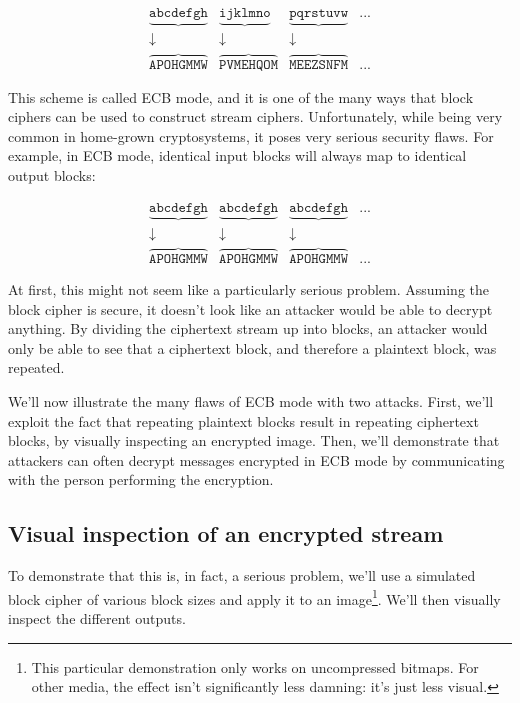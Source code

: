 \documentclass[11pt,ebook,table,dvipsnames]{memoir}
\begin{document}
\begin{equation}
\begin{matrix}
\underbrace{\mathtt{abcdefgh}} & \underbrace{\mathtt{ijklmno}} & \underbrace{\mathtt{pqrstuvw}} & ...\\
\downarrow & \downarrow & \downarrow & \\
\overbrace{\mathtt{APOHGMMW}} & \overbrace{\mathtt{PVMEHQOM}} & \overbrace{\mathtt{MEEZSNFM}} & ...
\end{matrix}
\end{equation}

This scheme is called \gls{ECB mode}, and it is one of the many ways
that block ciphers can be used to construct stream ciphers.
Unfortunately, while being very common in home-grown cryptosystems, it
poses very serious security flaws. For example, in ECB mode, identical
input blocks will always map to identical output blocks:

\begin{equation}
\begin{matrix}
\underbrace{\mathtt{abcdefgh}} & \underbrace{\mathtt{abcdefgh}} & \underbrace{\mathtt{abcdefgh}} & ...\\
\downarrow & \downarrow & \downarrow & \\
\overbrace{\mathtt{APOHGMMW}} & \overbrace{\mathtt{APOHGMMW}} & \overbrace{\mathtt{APOHGMMW}} & ...
\end{matrix}
\end{equation}

At first, this might not seem like a particularly serious problem.
Assuming the block cipher is secure, it doesn't look like an attacker
would be able to decrypt anything. By dividing the ciphertext stream
up into blocks, an attacker would only be able to see that a
ciphertext block, and therefore a plaintext block, was repeated.

We'll now illustrate the many flaws of ECB mode with two attacks.
First, we'll exploit the fact that repeating plaintext blocks result
in repeating ciphertext blocks, by visually inspecting an encrypted
image. Then, we'll demonstrate that attackers can often decrypt
messages encrypted in ECB mode by communicating with the person
performing the encryption.

\subsection{Visual inspection of an encrypted stream}
\label{sec-2-3-2-1}

To demonstrate that this is, in fact, a serious problem, we'll use a
simulated block cipher of various block sizes and apply it to an
image\footnote{This particular demonstration only works on uncompressed
bitmaps. For other media, the effect isn't significantly less damning:
it's just less visual.}. We'll then visually inspect the different
outputs.
\end{document}
